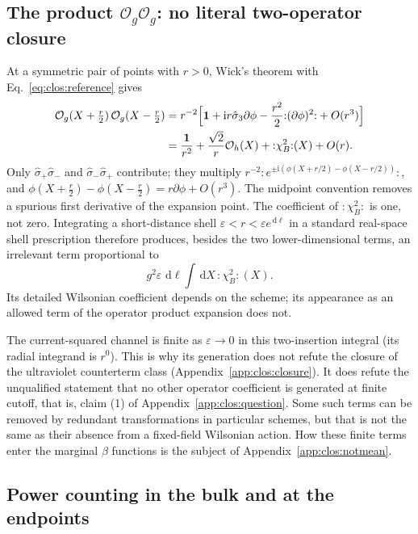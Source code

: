 \documentclass[11pt,a4paper]{article}
\numberwithin{equation}{section}
\newcommand{\dd}{\,\mathrm d}
\newcommand{\Og}{\mathcal O_g}
\newcommand{\Oh}{\mathcal O_h}
\begin{document}
\subsection{The product \texorpdfstring{$\Og\Og$}{OgOg}: no literal two-operator closure}\label{app:clos:counterexample}
At a symmetric pair of points with $r>0$, Wick's theorem with Eq.~\eqref{eq:clos:reference} gives
\begin{align}
 \Og(X+\tfrac r2)\,\Og(X-\tfrac r2)
 &=r^{-2}\Bigl[\mathbf 1+\mathrm i r\hat\sigma_3\partial\phi-\frac{r^2}{2}{:}(\partial\phi)^2{:}+O(r^3)\Bigr]
 \notag\\
 &=\frac{\mathbf 1}{r^2}+\frac{\sqrt2}{r}\Oh(X)+{:}\chi_B^2{:}(X)+O(r).
 \label{eq:clos:ope}
\end{align}
Only $\hat\sigma_+\hat\sigma_-$ and $\hat\sigma_-\hat\sigma_+$ contribute; they multiply
$r^{-2}{:}e^{\pm\mathrm i(\phi(X+r/2)-\phi(X-r/2))}{:}$, and $\phi(X+\frac r2)-\phi(X-\frac r2)=r\partial\phi+O(r^3)$.
The midpoint convention removes a spurious first derivative of the expansion point. The coefficient of ${:}\chi_B^2{:}$
is one, not zero. Integrating a short-distance shell $\varepsilon<r<\varepsilon e^{\dd\ell}$ in a standard real-space
shell prescription therefore produces, besides the two lower-dimensional terms, an irrelevant term proportional to
\begin{equation}
 g^2\varepsilon\,\dd\ell\int\dd X\,{:}\chi_B^2{:}(X).
\end{equation}
Its detailed Wilsonian coefficient depends on the scheme; its appearance as an allowed term of the operator product
expansion does not.

The current-squared channel is finite as $\varepsilon\to0$ in this two-insertion integral (its radial integrand is
$r^0$). This is why its generation does not refute the closure of the ultraviolet counterterm class
(Appendix~\ref{app:clos:closure}). It does refute the unqualified statement that no other operator coefficient is
generated at finite cutoff, that is, claim (1) of Appendix~\ref{app:clos:question}. Some such terms can be removed by
redundant transformations in particular schemes, but that is not the same as their absence from a fixed-field
Wilsonian action. How these finite terms enter the marginal $\beta$ functions is the subject of
Appendix~\ref{app:clos:notmean}.

\subsection{Power counting in the bulk and at the endpoints}\label{app:clos:power}
\end{document}

